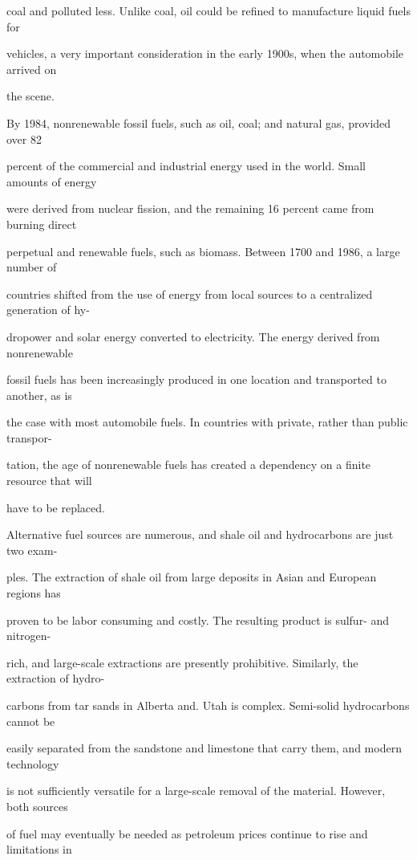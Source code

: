 \documentclass[12pt]{article}
\begin{document}
coal and polluted less. Unlike coal, oil could be refined to manufacture liquid fuels for\par
vehicles, a very important consideration in the early 1900s, when the automobile arrived on\par
the scene.\par
By 1984, nonrenewable fossil fuels, such as oil, coal; and natural gas, provided over 82\par
percent of the commercial and industrial energy used in the world. Small amounts of energy\par
were derived from nuclear fission, and the remaining 16 percent came from burning direct\par
perpetual and renewable fuels, such as biomass. Between 1700 and 1986, a large number of\par
countries shifted from the use of energy from local sources to a centralized generation of hy-\par
dropower and solar energy converted to electricity. The energy derived from nonrenewable\par
fossil fuels has been increasingly produced in one location and transported to another, as is\par
the case with most automobile fuels. In countries with private, rather than public transpor-\par
tation, the age of nonrenewable fuels has created a dependency on a finite resource that will\par
have to be replaced.\par
Alternative fuel sources are numerous, and shale oil and hydrocarbons are just two exam-\par
ples. The extraction of shale oil from large deposits in Asian and European regions has\par
proven to be labor consuming and costly. The resulting product is sulfur- and nitrogen-\par
rich, and large-scale extractions are presently prohibitive. Similarly, the extraction of hydro-\par
carbons from tar sands in Alberta and. Utah is complex. Semi-solid hydrocarbons cannot be\par
easily separated from the sandstone and limestone that carry them, and modern technology\par
is not sufficiently versatile for a large-scale removal of the material. However, both sources\par
of fuel may eventually be needed as petroleum prices continue to rise and limitations in\par
\end{document}
